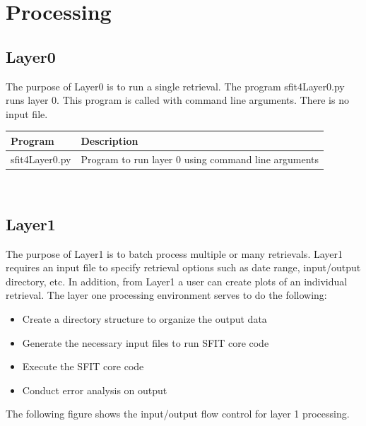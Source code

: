 \documentclass[12pt, letterpaper]{article}
\begin{document}
\section{Processing}
\subsection{Layer0}
The purpose of Layer0 is to run a single retrieval. The program sfit4Layer0.py runs layer 0. This program is called with command line arguments. There is no input file.\\ 

\begin{tabular}{ l l }
\textbf{Program} & \textbf{Description} \\
\hline
sfit4Layer0.py      & Program to run layer 0 using command line arguments\\
\end{tabular} \\

\subsection{Layer1}
The purpose of Layer1 is to batch process multiple or many retrievals. Layer1 requires an input file to specify retrieval options such as date range, input/output directory, etc. In addition, from Layer1 a user can create plots of an individual retrieval. The layer one processing environment serves to do the following:\\

\begin{itemize}
\item Create a directory structure to organize the output data
\item Generate the necessary input files to run SFIT core code
\item Execute the SFIT core code
\item Conduct error analysis on output
\end{itemize}

The following figure shows the input/output flow control for layer 1 processing.
\end{document}
